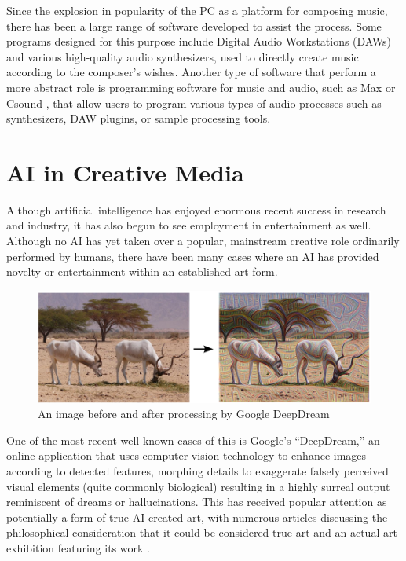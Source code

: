 \documentclass[ author={Stephen Livermore-Tozer},
				supervisor={Dr. Peter Flach},
				degree={MEng},
				title={Algorithmic Co-composition Using Machine Learning},
				subtitle={},
				type={research},
				year={2016} ]{dissertation}
\begin{document}
	Since the explosion in popularity of the PC as a platform for composing music, there has been a large range of software developed to assist the process. Some programs designed for this purpose include Digital Audio Workstations (DAWs) and various high-quality audio synthesizers, used to directly create music according to the composer's wishes. Another type of software that perform a more abstract role is programming software for music and audio, such as Max \cite{puckette2002max} or Csound \cite{boulanger2000csound}, that allow users to program various types of audio processes such as synthesizers, DAW plugins, or sample processing tools. 
	
	\section{AI in Creative Media}
	
	Although artificial intelligence has enjoyed enormous recent success in research and industry, it has also begun to see employment in entertainment as well. Although no AI has yet taken over a popular, mainstream creative role ordinarily performed by humans, there have been many cases where an AI has provided novelty or entertainment within an established art form.
	
	\begin{figure}[h]
		\centering
		\includegraphics[width=1.0\textwidth]{deep-dream-example}
		\caption{An image before and after processing by Google DeepDream}
	\end{figure}
	
	One of the most recent well-known cases of this is Google's ``DeepDream,'' an online application that uses computer vision technology to enhance images according to detected features, morphing details to exaggerate falsely perceived visual elements (quite commonly biological) resulting in a highly surreal output reminiscent of dreams or hallucinations. This has received popular attention as potentially a form of true AI-created art, with numerous articles discussing the philosophical consideration that it could be considered true art \cite{rayner2016google,galperina2015google} and an actual art exhibition featuring its work \cite{campbell2016inside}.
	
\end{document}
